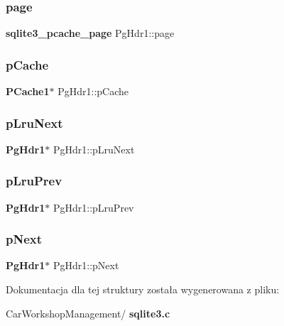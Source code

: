 \mbox{\label{struct_pg_hdr1_a121a9abbfea6b112ba77eeb84391ed47}} 
\subsubsection{page}
{\footnotesize\ttfamily \textbf{ sqlite3\+\_\+pcache\+\_\+page} Pg\+Hdr1\+::page}

\mbox{\label{struct_pg_hdr1_aa5b23de466773e72e1b6edf07b3a4570}} 
\subsubsection{pCache}
{\footnotesize\ttfamily \textbf{ P\+Cache1}$\ast$ Pg\+Hdr1\+::p\+Cache}

\mbox{\label{struct_pg_hdr1_ae22cfc3a39fe029a8f8fdd70e7ca4055}} 
\subsubsection{pLruNext}
{\footnotesize\ttfamily \textbf{ Pg\+Hdr1}$\ast$ Pg\+Hdr1\+::p\+Lru\+Next}

\mbox{\label{struct_pg_hdr1_adf220ef63d6ceb782ac87a08aeb1722d}} 
\subsubsection{pLruPrev}
{\footnotesize\ttfamily \textbf{ Pg\+Hdr1}$\ast$ Pg\+Hdr1\+::p\+Lru\+Prev}

\mbox{\label{struct_pg_hdr1_acde43ab0ed0fbba33e526058d9c343b9}} 
\subsubsection{pNext}
{\footnotesize\ttfamily \textbf{ Pg\+Hdr1}$\ast$ Pg\+Hdr1\+::p\+Next}



Dokumentacja dla tej struktury została wygenerowana z pliku\+:\begin{DoxyCompactItemize}
\item 
Car\+Workshop\+Management/\textbf{ sqlite3.\+c}\end{DoxyCompactItemize}
